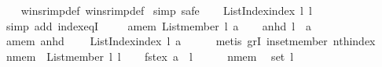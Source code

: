 \begin{isabellebody}
%
\isadelimproof
\ \ %
\endisadelimproof
%
\isatagproof
{}\isamarkupfalse%
\ winsr{\isacharunderscore}{\kern0pt}imp{\isacharprime}{\kern0pt}{\isacharunderscore}{\kern0pt}def\ winsr{\isacharunderscore}{\kern0pt}imp{\isacharunderscore}{\kern0pt}def\isanewline
{}\isamarkupfalse%
\ {\isacharparenleft}{\kern0pt}simp{\isacharcomma}{\kern0pt}\ safe{\isacharparenright}{\kern0pt}\isanewline
\ \ \isamarkupfalse%
\ {\isachardoublequoteopen}List{\isacharunderscore}{\kern0pt}Index{\isachardot}{\kern0pt}index\ l\ {\isacharparenleft}{\kern0pt}l\ {\isacharbang}{\kern0pt}\ {}{\isacharparenright}{\kern0pt}\ {\isacharequal}{\kern0pt}\ {}{\isachardoublequoteclose}\isanewline
\ \ \ \ \isamarkupfalse%
\ {\isacharparenleft}{\kern0pt}simp\ add{\isacharcolon}{\kern0pt}\ index{\isacharunderscore}{\kern0pt}eqI{\isacharparenright}{\kern0pt}\ \isanewline
{}\isamarkupfalse%
\isanewline
\ \ \isamarkupfalse%
\ amem{\isacharcolon}{\kern0pt}\ {\isachardoublequoteopen}List{\isachardot}{\kern0pt}member\ l\ a{\isachardoublequoteclose}\isanewline
\ \ \isamarkupfalse%
\ anhd{\isacharcolon}{\kern0pt}\ {\isachardoublequoteopen}l{\isacharbang}{\kern0pt}{}\ {\isasymnoteq}\ a{\isachardoublequoteclose}\isanewline
\ \ \isamarkupfalse%
\ amem\ anhd\ \isamarkupfalse%
\ {\isachardoublequoteopen}{}\ {\isacharless}{\kern0pt}\ List{\isacharunderscore}{\kern0pt}Index{\isachardot}{\kern0pt}index\ l\ a{\isachardoublequoteclose}\isanewline
\ \ \ \ \isamarkupfalse%
\ {\isacharparenleft}{\kern0pt}metis\ gr{}I\ in{\isacharunderscore}{\kern0pt}set{\isacharunderscore}{\kern0pt}member\ nth{\isacharunderscore}{\kern0pt}index{\isacharparenright}{\kern0pt}\isanewline
{}\isamarkupfalse%
\isanewline
\ \ \isamarkupfalse%
\ nmem{\isacharcolon}{\kern0pt}\ {\isachardoublequoteopen}{\isasymnot}\ List{\isachardot}{\kern0pt}member\ l\ {\isacharparenleft}{\kern0pt}l{\isacharbang}{\kern0pt}{}{\isacharparenright}{\kern0pt}{\isachardoublequoteclose}\isanewline
\ \ \isamarkupfalse%
\ fstex{\isacharcolon}{\kern0pt}\ {\isachardoublequoteopen}a\ {\isacharequal}{\kern0pt}\ l\ {\isacharbang}{\kern0pt}\ {}{\isachardoublequoteclose}\isanewline
\ \ \isamarkupfalse%
\ nmem\ \isamarkupfalse%
\ {\isachardoublequoteopen}set\ l\ {\isacharequal}{\kern0pt}\ {\isacharbraceleft}{\kern0pt}{\isacharbraceright}{\kern0pt}{\isachardoublequoteclose}\isanewline

\end{isabellebody}
